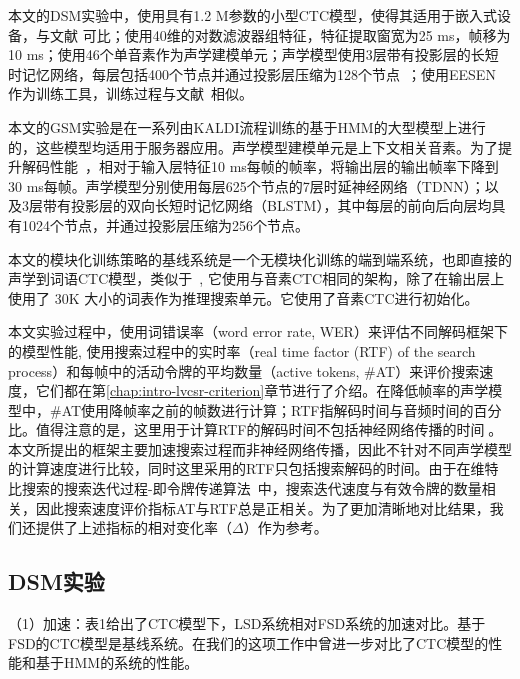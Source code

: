 本文的DSM实验中，使用具有1.2 M参数的小型CTC模型，使得其适用于嵌入式设备，与文献 \cite{mcgraw2016personalized}可比；使用40维的对数滤波器组特征，特征提取窗宽为25 ms，帧移为10 ms；使用46个单音素作为声学建模单元；声学模型使用3层带有投影层的长短时记忆网络，每层包括400个节点并通过投影层压缩为128个节点~\cite{sak2014long}；使用EESEN \cite{miao2016ctc}作为训练工具，训练过程与文献~\cite{miao2015eesen}相似。

本文的GSM实验是在一系列由KALDI流程\cite{povey2011kaldi}训练的基于HMM的大型模型上进行的，这些模型均适用于服务器应用。声学模型建模单元是上下文相关音素。为了提升解码性能~\cite{pundak2016lower,povey2016purely}，相对于输入层特征10 ms每帧的帧率，将输出层的输出帧率下降到30 ms每帧。声学模型分别使用每层625个节点的7层时延神经网络（TDNN）；以及3层带有投影层的双向长短时记忆网络（BLSTM），其中每层的前向后向层均具有1024个节点，并通过投影层压缩为256个节点。

本文的模块化训练策略的基线系统是一个无模块化训练的端到端系统，也即直接的声学到词语CTC模型，类似于~\cite{audhkhasi2017direct}, 它使用与音素CTC相同的架构，除了在输出层上使用了 30K 大小的词表作为推理搜索单元。它使用了音素CTC进行初始化。

本文实验过程中，使用词错误率（word error rate, WER）来评估不同解码框架下的模型性能, 使用搜索过程中的实时率（real time factor (RTF) of the search process）和每帧中的活动令牌的平均数量（active tokens, \#AT）来评价搜索速度，它们都在第\ref{chap:intro-lvcsr-criterion}章节进行了介绍。在降低帧率的声学模型中，\#AT使用降帧率之前的帧数进行计算；RTF指解码时间与音频时间的百分比。值得注意的是，这里用于计算RTF的解码时间不包括神经网络传播的时间\cite{you2009parallel,hauswald2015sirius}。本文所提出的框架主要加速搜索过程而非神经网络传播，因此不针对不同声学模型的计算速度进行比较，同时这里采用的RTF只包括搜索解码的时间。由于在维特比搜索的搜索迭代过程-即令牌传递算法~\cite{hori2013speech}中，搜索迭代速度与有效令牌的数量相关，因此搜索速度评价指标AT与RTF总是正相关。为了更加清晰地对比结果，我们还提供了上述指标的相对变化率（$\Delta$）作为参考。

\subsection{DSM实验}
\label{exp:dsm}

（1）加速：表1给出了CTC模型下，LSD系统相对FSD系统的加速对比。基于FSD的CTC模型是基线系统。在我们的这项工作中\cite{7736093}曾进一步对比了CTC模型的性能和基于HMM的系统的性能。


